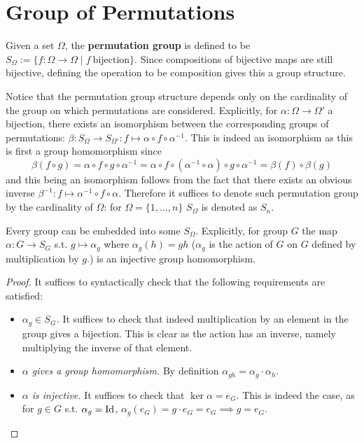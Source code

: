 \section{Group of Permutations}

\begin{definition}
    Given a set $\Omega$, the \textbf{permutation group} is defined to be $S_{\Omega} := \{f: \Omega \to \Omega \mid f\ \text{bijection}\}$. Since compositions of bijective maps are still bijective, defining the operation to be composition gives this a group structure.
\end{definition}

\begin{remark}
    Notice that the permutation group structure depends only on the cardinality of the group on which permutations are considered. Explicitly, for $\alpha: \Omega \to \Omega'$ a bijection, there exists an isomorphism between the corresponding groups of permutations: $\beta: S_{\Omega} \to S_{\Omega'}: f \mapsto \alpha \circ f \circ \alpha^{-1}$. This is indeed an isomorphism as this is first a group homomorphism since
    \[
        \beta(f \circ g) = \alpha \circ f \circ g \circ \alpha^{-1} = \alpha \circ f \circ (\alpha^{-1} \circ \alpha) \circ g \circ \alpha^{-1} = \beta(f) \circ \beta(g)
    \]
    and this being an isomorphism follows from the fact that there exists an obvious inverse $\beta^{-1}: f \mapsto \alpha^{-1} \circ f \circ \alpha$. Therefore it suffices to denote such permutation group by the cardinality of $\Omega$: for $\Omega = \{1, \dots, n\}$ $S_{\Omega}$ is denoted as $S_n$.
\end{remark}

\begin{proposition}[Cayley]
    Every group can be embedded into some $S_{\Omega}$. Explicitly, for group $G$ the map $\alpha: G \to S_G$ s.t. $g \mapsto \alpha_g$ where $\alpha_g(h) = gh$ ($\alpha_g$ is the action of $G$ on $G$ defined by multiplication by $g$.) is an injective group homomorphism.
\end{proposition}

\begin{proof}
    It suffices to syntactically check that the following requirements are satisfied:
    \begin{itemize}
        \item \emph{$\alpha_g \in S_G$.} It suffices to check that indeed multiplication by an element in the group gives a bijection. This is clear as the action has an inverse, namely multiplying the inverse of that element. 
        \item \emph{$\alpha$ gives a group homomorphism.} By definition $\alpha_{gh} = \alpha_g \cdot \alpha_h$.
        \item \emph{$\alpha$ is injective.} It suffices to check that $\ker \alpha = e_G$. This is indeed the case, as for $g \in G$ s.t. $\alpha_g = \mathrm{Id}$, $\alpha_g(e_G) = g \cdot e_G = e_G \implies g = e_G$.
    \end{itemize}
\end{proof}

